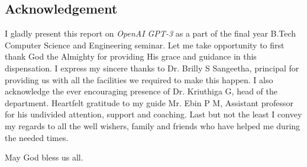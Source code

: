 \documentclass[12pt, a4paper]{report}
\begin{document}

\newpage
\begin{center}
    \section*{Acknowledgement}
\end{center}

I gladly present this report on \emph{OpenAI GPT-3} as a part of the final year B.Tech Computer Science and Engineering seminar. Let me take opportunity to first thank God the Almighty for providing His grace and guidance in this dispensation.
I express my sincere thanks to Dr. Brilly S Sangeetha, principal for providing us with all the facilities we required to make this happen. I also acknowledge the ever encouraging presence of Dr. Kriuthiga G, head of the department.
Heartfelt gratitude to my guide Mr. Ebin P M, Assistant professor for his undivided attention, support and coaching. Last but not the least I convey my regards to all the well wishers, family and friends who have helped me during the needed times. \\

\begin{center}
    May God bless us all.
\end{center}

\newpage
\end{document}
